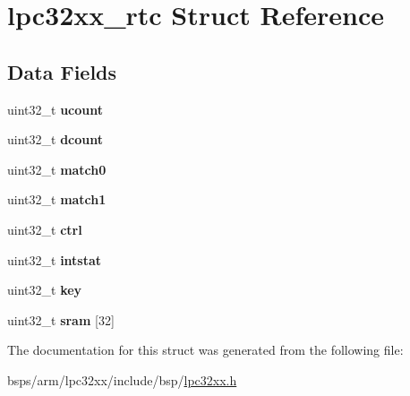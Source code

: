 \hypertarget{structlpc32xx__rtc}{}\section{lpc32xx\+\_\+rtc Struct Reference}
\label{structlpc32xx__rtc}
\subsection*{Data Fields}
\begin{DoxyCompactItemize}
\item 
\mbox{\label{structlpc32xx__rtc_a44527348190ed0fba9ad2786bcf3dfb4}} 
uint32\+\_\+t {\bfseries ucount}
\item 
\mbox{\label{structlpc32xx__rtc_af3247e555857da24d6c4e71244be5497}} 
uint32\+\_\+t {\bfseries dcount}
\item 
\mbox{\label{structlpc32xx__rtc_ae39387fd374a3d1cb62f8de4e859b2a6}} 
uint32\+\_\+t {\bfseries match0}
\item 
\mbox{\label{structlpc32xx__rtc_ad5f4d84f053aeef8791e95efb0304b18}} 
uint32\+\_\+t {\bfseries match1}
\item 
\mbox{\label{structlpc32xx__rtc_a7b506fc67cd581b5674503269792c189}} 
uint32\+\_\+t {\bfseries ctrl}
\item 
\mbox{\label{structlpc32xx__rtc_a118711bb02a551a2f34223a15ff63da7}} 
uint32\+\_\+t {\bfseries intstat}
\item 
\mbox{\label{structlpc32xx__rtc_accaf23aa870d11e99b0e04293a8b6526}} 
uint32\+\_\+t {\bfseries key}
\item 
\mbox{\label{structlpc32xx__rtc_a83bbf799661bbf7a5e225dacf68d8a39}} 
uint32\+\_\+t {\bfseries sram} \mbox{[}32\mbox{]}
\end{DoxyCompactItemize}


The documentation for this struct was generated from the following file\+:\begin{DoxyCompactItemize}
\item 
bsps/arm/lpc32xx/include/bsp/\mbox{\hyperlink{lpc32xx_8h}{lpc32xx.\+h}}\end{DoxyCompactItemize}
